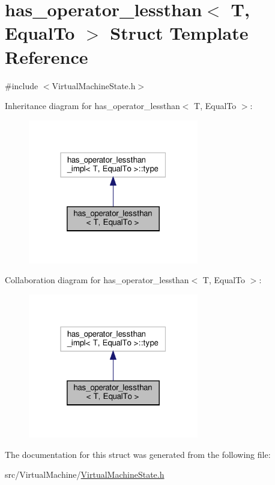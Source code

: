 \hypertarget{structhas__operator__lessthan}{}\section{has\+\_\+operator\+\_\+lessthan$<$ T, Equal\+To $>$ Struct Template Reference}
\label{structhas__operator__lessthan}


{\ttfamily \#include $<$Virtual\+Machine\+State.\+h$>$}



Inheritance diagram for has\+\_\+operator\+\_\+lessthan$<$ T, Equal\+To $>$\+:\nopagebreak
\begin{figure}[H]
\begin{center}
\leavevmode
\includegraphics[width=211pt]{structhas__operator__lessthan__inherit__graph}
\end{center}
\end{figure}


Collaboration diagram for has\+\_\+operator\+\_\+lessthan$<$ T, Equal\+To $>$\+:\nopagebreak
\begin{figure}[H]
\begin{center}
\leavevmode
\includegraphics[width=211pt]{structhas__operator__lessthan__coll__graph}
\end{center}
\end{figure}


The documentation for this struct was generated from the following file\+:\begin{DoxyCompactItemize}
\item 
src/\+Virtual\+Machine/\hyperlink{_virtual_machine_state_8h}{Virtual\+Machine\+State.\+h}\end{DoxyCompactItemize}
